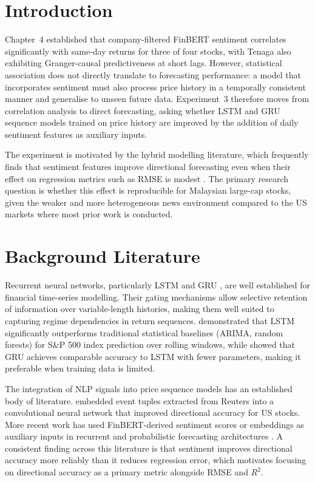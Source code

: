 \documentclass[12pt]{ucetd}
\begin{document}
\section{Introduction}

Chapter~4 established that company-filtered FinBERT sentiment correlates significantly with same-day returns for three of four stocks, with Tenaga also exhibiting Granger-causal predictiveness at short lags. However, statistical association does not directly translate to forecasting performance: a model that incorporates sentiment must also process price history in a temporally consistent manner and generalise to unseen future data. Experiment~3 therefore moves from correlation analysis to direct forecasting, asking whether LSTM and GRU sequence models trained on price history are improved by the addition of daily sentiment features as auxiliary inputs.

The experiment is motivated by the hybrid modelling literature, which frequently finds that sentiment features improve directional forecasting even when their effect on regression metrics such as RMSE is modest \cite{ding2015deep, halder2024finbert, soliman2025improving}. The primary research question is whether this effect is reproducible for Malaysian large-cap stocks, given the weaker and more heterogeneous news environment compared to the US markets where most prior work is conducted.

\section{Background Literature}

Recurrent neural networks, particularly LSTM \cite{hochreiter1997long} and GRU \cite{chung2014empirical}, are well established for financial time-series modelling. Their gating mechanisms allow selective retention of information over variable-length histories, making them well suited to capturing regime dependencies in return sequences. \citet{fischer2018deep} demonstrated that LSTM significantly outperforms traditional statistical baselines (ARIMA, random forests) for S\&P 500 index prediction over rolling windows, while \citet{siami2019performance} showed that GRU achieves comparable accuracy to LSTM with fewer parameters, making it preferable when training data is limited.

The integration of NLP signals into price sequence models has an established body of literature. \citet{ding2015deep} embedded event tuples extracted from Reuters into a convolutional neural network that improved directional accuracy for US stocks. More recent work has used FinBERT-derived sentiment scores or embeddings as auxiliary inputs in recurrent and probabilistic forecasting architectures \cite{halder2024finbert, gu2024predicting, kim2023forecasting, liu2023stock, soliman2025improving, yang2020finbert}. A consistent finding across this literature is that sentiment improves directional accuracy more reliably than it reduces regression error, which motivates focusing on directional accuracy as a primary metric alongside RMSE and $R^2$.
\end{document}
